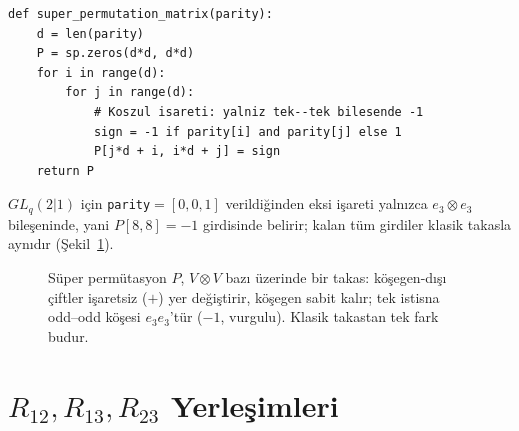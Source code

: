 \documentclass[12pt,a4paper,fleqn]{report}
\newcommand{\normalsemi}{;}
\newcommand{\normalsemi}{\begingroup\semicolonfont;\endgroup}
\numberwithin{equation}{chapter}
\theoremstyle{plain}
\theoremstyle{definition}
\begin{document}
\begin{lstlisting}[style=pyblock,caption={$V \otimes V$ Üzerinde Süper Permütasyon Matrisi}]
def super_permutation_matrix(parity):
    d = len(parity)
    P = sp.zeros(d*d, d*d)
    for i in range(d):
        for j in range(d):
            # Koszul isareti: yalniz tek--tek bilesende -1
            sign = -1 if parity[i] and parity[j] else 1
            P[j*d + i, i*d + j] = sign
    return P
\end{lstlisting}

$GL_q(2|1)$ için \texttt{parity}$=[0,0,1]$ verildiğinden eksi işareti yalnızca
$e_3\otimes e_3$ bileşeninde, yani $P[8,8]=-1$ girdisinde belirir\normalsemi{} kalan tüm
girdiler klasik takasla aynıdır (Şekil~\ref{fig:superperm}).

\begin{figure}[h]
\centering
{}
\caption{Süper permütasyon $P$, $V\otimes V$ bazı üzerinde bir takas: köşegen-dışı
çiftler işaretsiz ($+$) yer değiştirir, köşegen sabit kalır\normalsemi{} tek istisna
odd--odd köşesi $e_3e_3$'tür ($-1$, vurgulu). Klasik takastan tek fark budur.}
\label{fig:superperm}
\end{figure}

\section{$R_{12}, R_{13}, R_{23}$ Yerleşimleri}
\end{document}
